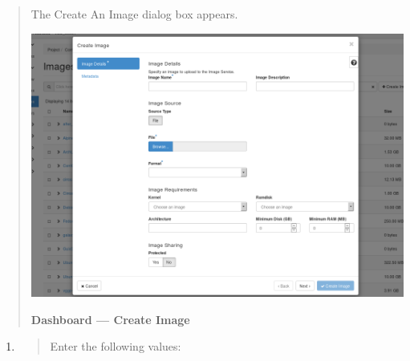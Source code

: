 \begin{quote}
The Create An Image dialog box appears.

\begin{center}
\includegraphics[scale=0.4]{img/tab-compute-images-create.png}
\end{center}

\textbf{Dashboard --- Create Image}
\end{quote}

\begin{enumerate}
\def\labelenumi{\arabic{enumi}.}
\item
  \begin{quote}
  Enter the following values:
  \end{quote}
\end{enumerate}

